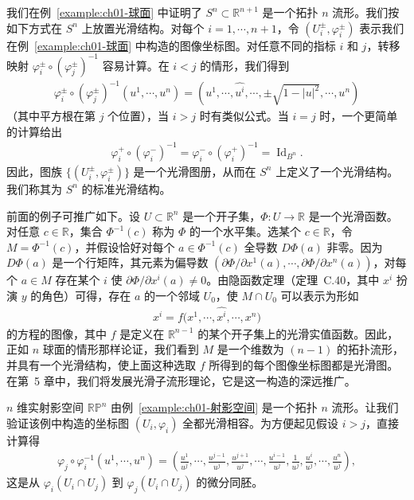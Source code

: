 \documentclass[../../main.tex]{subfiles}
\begin{document}
\begin{example}[球面]\label{example:ch01-球面光滑结构}
我们在例~\cref{example:ch01-球面} 中证明了 $S^{n}\subset\mathbb{R}^{n+1}$ 是一个拓扑 $n$ 流形。我们按如下方式在 $S^{n}$ 上放置光滑结构。对每个 $i=1,\cdots ,n+1$，令 $(U_{i}^{\pm},\varphi_{i}^{\pm})$ 表示我们在例~\cref{example:ch01-球面} 中构造的图像坐标图。对任意不同的指标 $i$ 和 $j$，转移映射 $\varphi_{i}^{\pm}\circ(\varphi_{j}^{\pm})^{-1}$ 容易计算。在 $i<j$ 的情形，我们得到
\begin{align*}
\varphi_{i}^{\pm}\circ(\varphi_{j}^{\pm})^{-1}(u^{1},\cdots ,u^{n})
=(u^{1},\cdots ,\widehat{u^{i}},\cdots ,\pm\sqrt{1-|u|^{2}},\cdots ,u^{n})
\end{align*}
（其中平方根在第 $j$ 个位置），当 $i>j$ 时有类似公式。当 $i=j$ 时，一个更简单的计算给出
\begin{align*}
\varphi_{i}^{+}\circ(\varphi_{i}^{-})^{-1}=\varphi_{i}^{-}\circ(\varphi_{i}^{+})^{-1}=\operatorname{Id}_{B^{n}}.
\end{align*}
因此，图族 $\{(U_{i}^{\pm},\varphi_{i}^{\pm})\}$ 是一个光滑图册，从而在 $S^{n}$ 上定义了一个光滑结构。我们称其为 $S^{n}$ 的标准光滑结构。
\end{example}

\begin{example}[水平集]\label{example:ch01-水平集}
前面的例子可推广如下。设 $U\subset\mathbb{R}^{n}$ 是一个开子集，$\Phi:U\to\mathbb{R}$ 是一个光滑函数。对任意 $c\in\mathbb{R}$，集合 $\Phi^{-1}(c)$ 称为 $\Phi$ 的一个水平集。选某个 $c\in\mathbb{R}$，令 $M=\Phi^{-1}(c)$，并假设恰好对每个 $a\in\Phi^{-1}(c)$ 全导数 $D\Phi(a)$ 非零。因为 $D\Phi(a)$ 是一个行矩阵，其元素为偏导数 $(\partial\Phi/\partial x^{1}(a),\cdots ,\partial\Phi/\partial x^{n}(a))$，对每个 $a\in M$ 存在某个 $i$ 使 $\partial\Phi/\partial x^{i}(a)\neq 0$。由隐函数定理（定理~C.40，其中 $x^{i}$ 扮演 $y$ 的角色）可得，存在 $a$ 的一个邻域 $U_{0}$，使 $M\cap U_{0}$ 可以表示为形如
\begin{align*}
x^{i}=f\bigl(x^{1},\cdots ,\widehat{x^{i}},\cdots ,x^{n}\bigr)
\end{align*}
的方程的图像，其中 $f$ 是定义在 $\mathbb{R}^{n-1}$ 的某个开子集上的光滑实值函数。因此，正如 $n$ 球面的情形那样论证，我们看到 $M$ 是一个维数为 $(n-1)$ 的拓扑流形，并具有一个光滑结构，使上面这种选取 $f$ 所得到的每个图像坐标图都是光滑图。在第~5 章中，我们将发展光滑子流形理论，它是这一构造的深远推广。
\end{example}

\begin{example}[射影空间]\label{example:ch01-射影空间光滑结构}
$n$ 维实射影空间 $\mathbb{RP}^{n}$ 由例~\cref{example:ch01-射影空间} 是一个拓扑 $n$ 流形。让我们验证该例中构造的坐标图 $(U_{i},\varphi_{i})$ 全都光滑相容。为方便起见假设 $i>j$，直接计算得
\begin{align*}
\varphi_{j}\circ\varphi_{i}^{-1}(u^{1},\cdots ,u^{n})
=\left(\frac{u^{1}}{u^{j}},\cdots ,\frac{u^{j-1}}{u^{j}},\frac{u^{j+1}}{u^{j}},\cdots ,\frac{u^{i-1}}{u^{j}},\frac{1}{u^{j}},\frac{u^{i}}{u^{j}},\cdots ,\frac{u^{n}}{u^{j}}\right),
\end{align*}
这是从 $\varphi_{i}(U_{i}\cap U_{j})$ 到 $\varphi_{j}(U_{i}\cap U_{j})$ 的微分同胚。
\end{example}
\end{document}
